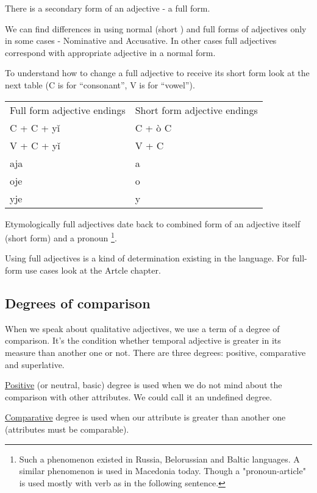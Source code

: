 There is a secondary form of an adjective - a full form.

We can find differences in using normal (short ) and full forms of adjectives only in some cases - Nominative and Accusative. In other cases full adjectives correspond with appropriate adjective in a normal form.

To understand how to change a full adjective to receive its short form look at the next table (C is for “consonant”, V is for “vowel”).

\begin{table}
	\begin{tabular}{ll}
		Full form adjective endings & Short form adjective endings \\
		C + C + yǐ & C + ò C \\
	    V + C + yǐ & V + C \\
		aja & a \\
		oje  & o \\
		yje & y \\
	\end{tabular}
\end{table}

Etymologically full adjectives date back to combined form of an adjective itself (short form) and a pronoun \footnote{Such a phenomenon existed in Russia, Belorussian and Baltic languages. A similar phenomenon is used in Macedonia today. Though a "pronoun-article" is used mostly with verb as in the following sentence.}. 

Using full adjectives is a kind of determination existing in the language. For full-form use cases look at the Artcle chapter.

\subsection{Degrees of comparison}

When we speak about qualitative adjectives, we use a term of a degree of comparison. It’s the condition whether temporal adjective is greater in its measure than another one or not. There are three degrees: positive, comparative and superlative.

\underline{Positive} (or neutral, basic) degree is used when we do not mind about the comparison with other attributes. We could call it an undefined degree.

\underline{Comparative} degree is used when our attribute is greater than another one (attributes must be comparable).  

